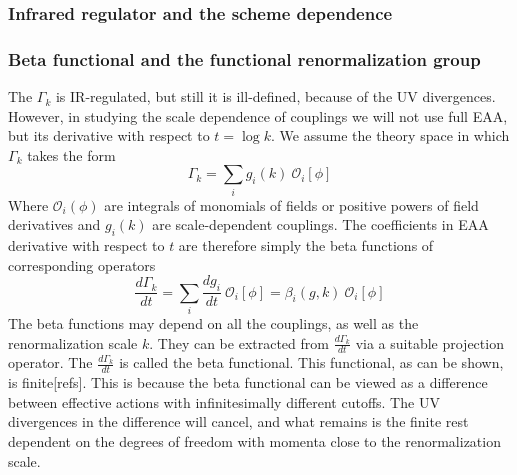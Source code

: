 \documentclass[11pt, a4paper]{article}
\begin{document}
\subsubsection*{\centering Infrared regulator and the scheme dependence}

\subsubsection*{\centering Beta functional and the functional renormalization group}

The $\Gamma_k$ is IR-regulated, but still it is ill-defined, because of the UV divergences. 
However, in studying the scale dependence of couplings we will not use full EAA, 
but its derivative with respect to $t = \log{k}$.
We assume the theory space in which $\Gamma_k$ takes the form
\begin{equation}
    \Gamma_k = \sum_i g_i(k) \ \mathcal{O}_i [\phi]
\end{equation}
Where $\mathcal{O}_i (\phi)$ are integrals of monomials of fields or positive powers of field derivatives 
and $g_i(k)$ are scale-dependent couplings.
The coefficients in EAA derivative with respect to $t$ are therefore simply the beta functions of corresponding operators
\begin{equation}
    \frac{d \Gamma_k}{dt} = \sum_i \frac{d g_i}{dt} \ \mathcal{O}_i [\phi] = \beta_i(g,k) \ \mathcal{O}_i [\phi]
\end{equation}
The beta functions may depend on all the couplings, as well as the renormalization scale $k$.
They can be extracted from $\frac{d \Gamma_k}{dt}$ via a suitable projection operator. 
The $\frac{d \Gamma_k}{dt}$ is called the beta functional. This functional, as can be shown, is finite[refs].
This is because the beta functional can be viewed as a difference between effective actions with infinitesimally
different cutoffs. The UV divergences in the difference will cancel, and what remains is the finite rest
dependent on the degrees of freedom with momenta close to the renormalization scale.
\end{document}
